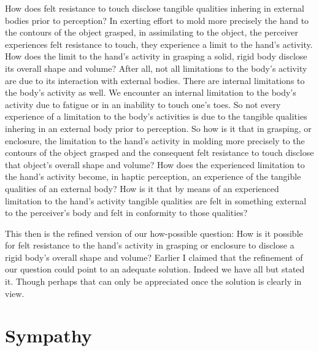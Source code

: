 \documentclass[12pt]{article}
\begin{document}
How does felt resistance to touch disclose tangible qualities inhering in external bodies prior to perception? In exerting effort to mold more precisely the hand to the contours of the object grasped, in assimilating to the object, the perceiver experiences felt resistance to touch, they experience a limit to the hand's activity. How does the limit to the hand's activity in grasping a solid, rigid body disclose its overall shape and volume? After all, not all limitations to the body's activity are due to its interaction with external bodies. There are internal limitations to the body's activity as well. We encounter an internal limitation to the body's activity due to fatigue or in an inability to touch one's toes. So not every experience of a limitation to the body's activities is due to the tangible qualities inhering in an external body prior to perception. So how is it that in grasping, or enclosure, the limitation to the hand's activity in molding more precisely to the contours of the object grasped and the consequent felt resistance to touch disclose that object's overall shape and volume? How does the experienced limitation to the hand's activity become, in haptic perception, an experience of the tangible qualities of an external body? How is it that by means of an experienced limitation to the hand's activity tangible qualities are felt in something external to the perceiver's body and felt in conformity to those qualities?

This then is the refined version of our how-possible question: How is it possible for felt resistance to the hand's activity in grasping or enclosure to disclose a rigid body's overall shape and volume? Earlier I claimed that the refinement of our question could point to an adequate solution. Indeed we have all but stated it. Though perhaps that can only be appreciated once the solution is clearly in view.


\section{Sympathy} %
\label{sec:sympathy}
\end{document}
